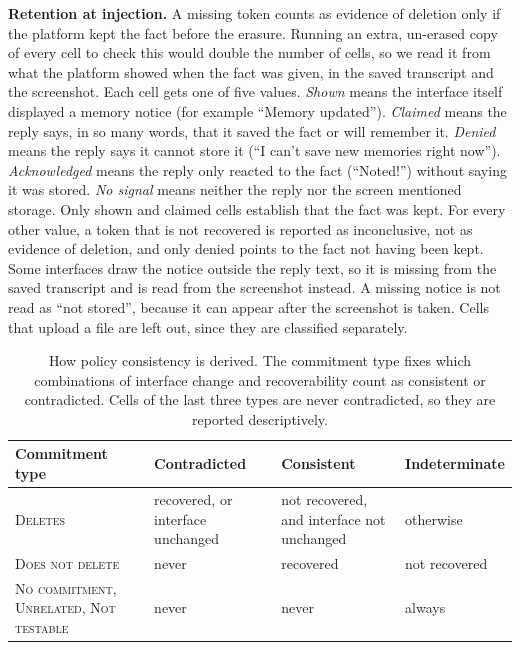 \documentclass[conference,compsoc]{IEEEtran}
\begin{document}
\textbf{Retention at injection.} A missing token counts as evidence of
deletion only if the platform kept the fact before the erasure. Running an
extra, un-erased copy of every cell to check this would double the number
of cells, so we read it from what the platform showed when the fact was
given, in the saved transcript and the screenshot. Each cell gets one of
five values. \textit{Shown} means the interface itself displayed a memory
notice (for example ``Memory updated''). \textit{Claimed} means the reply
says, in so many words, that it saved the fact or will remember it.
\textit{Denied} means the reply says it cannot store it (``I can't save
new memories right now''). \textit{Acknowledged} means the reply only
reacted to the fact (``Noted!'') without saying it was stored. \textit{No
signal} means neither the reply nor the screen mentioned storage. Only
shown and claimed cells establish that the fact was kept. For every other
value, a token that is not recovered is reported as inconclusive, not as
evidence of deletion, and only denied points to the fact not having been
kept. Some interfaces draw the notice outside the reply text, so it is
missing from the saved transcript and is read from the screenshot instead.
A missing notice is not read as ``not stored'', because it can appear after
the screenshot is taken. Cells that upload a file are left out, since they
are classified separately.

\begin{table}[t]
\centering
\caption{How policy consistency is derived. The commitment type fixes
which combinations of interface change and recoverability count as
consistent or contradicted. Cells of the last three types are never
contradicted, so they are reported descriptively.}
\label{tab:consistency-rule}
\small
\setlength{\tabcolsep}{3.5pt}
\begin{tabular}{@{}p{}p{}p{}p{}@{}}
\toprule
Commitment type & Contradicted & Consistent & Indeterminate \\
\midrule
\textsc{Deletes} & recovered, or interface unchanged
 & not recovered, and interface not unchanged & otherwise \\
\textsc{Does not delete} & never & recovered & not recovered \\
\textsc{No commitment}, \textsc{Unrelated}, \textsc{Not testable}
 & never & never & always \\
\bottomrule
\end{tabular}
\end{table}
\end{document}

